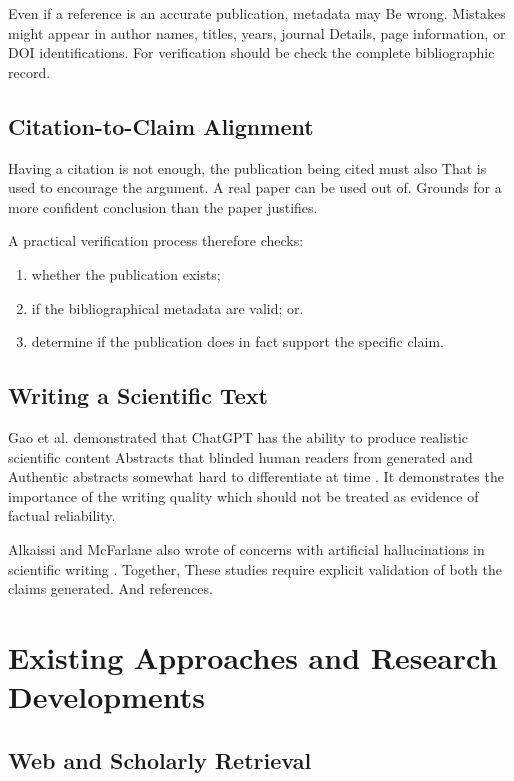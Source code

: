 \documentclass[acmsmall,screen]{acmart}
\begin{document}
Even if a reference is an accurate publication, metadata may
Be wrong. Mistakes might appear in author names, titles, years, journal
Details, page information, or DOI identifications. For verification should be
check the complete bibliographic record.

\subsection{Citation-to-Claim Alignment}

Having a citation is not enough, the publication being cited must also
That is used to encourage the argument. A real paper can be used out of.
Grounds for a more confident conclusion than the paper justifies.

A practical verification process therefore checks:

\begin{enumerate}

\item whether the publication exists;

\item if the bibliographical metadata are valid; or.
\item determine if the publication does in fact support the specific claim.

\end{enumerate}

\subsection{Writing a Scientific Text}

Gao et al. demonstrated that ChatGPT has the ability to produce realistic scientific content
Abstracts that blinded human readers from generated and
Authentic abstracts somewhat hard to differentiate at time
\cite{gao2023abstracts}. It demonstrates the importance of the writing quality which should not
be treated as evidence of factual reliability.

Alkaissi and McFarlane also wrote of concerns with artificial
hallucinations in scientific writing \cite{alkaissi2023}. Together,
These studies require explicit validation of both the claims generated.
And references.

\section{Existing Approaches and Research Developments}

\subsection{Web and Scholarly Retrieval}
\end{document}

